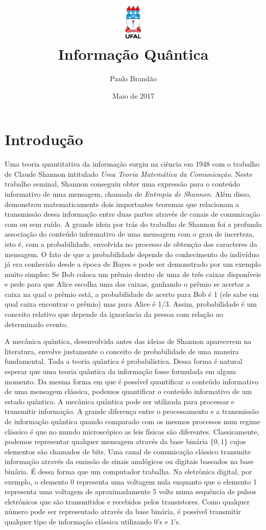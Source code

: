 \documentclass{article}
\title{\includegraphics[width=0.1\textwidth]{ufallogo.png} \\
\Huge{\color{astral}\textbf{Informação Quântica}}}
\author{Paulo Brandão}
\date{Maio de 2017}
\begin{document}
\maketitle

\section{Introdução}

Uma teoria quantitativa da informação surgiu na ciência em 1948 com o trabalho de Claude Shannon intitulado \textit{Uma Teoria Matemática da Comunicação}. Neste trabalho seminal, Shannon conseguiu obter uma expressão para o conteúdo informativo de uma mensagem, chamada de \textit{Entropia de Shannon}. Além disso, demonstrou matematicamente dois importantes teoremas que relacionam a transmissão dessa informação entre duas partes através de canais de comunicação com ou sem ruído. A grande ideia por trás do trabalho de Shannon foi a profunda associação do conteúdo informativo de uma mensagem com o grau de incerteza, isto é, com a probabilidade, envolvida no processo de obtenção dos caracteres da mensagem. O fato de que a probabilidade depende do conhecimento do indivíduo já era conhecido desde a época de Bayes e pode ser demonstrado por um exemplo muito simples: Se Bob coloca um prêmio dentro de uma de três caixas disponíveis e pede para que Alice escolha uma das caixas, ganhando o prêmio se acertar a caixa na qual o prêmio está, a probabilidade de acerto para Bob é 1 (ele sabe em qual caixa encontrar o prêmio) mas para Alice é 1/3. Assim, probabilidade é um conceito relativo que depende da ignorância da pessoa com relação ao determinado evento.

A mecânica quântica, desenvolvida antes das ideias de Shannon aparecerem na literatura, envolve justamente o conceito de probabilidade de uma maneira fundamental. Toda a teoria quântica é probabilística. Dessa forma é natural esperar que uma teoria quântica da informação fosse formulada em algum momento. Da mesma forma em que é possível quantificar o conteúdo informativo de uma mensagem clássica, podemos quantificar o conteúdo informativo de um estado quântico. A mecânica quântica pode ser utilizada para processar e transmitir informação. A grande diferença entre o processamento e a transmissão de informação quântica quando comparado com os mesmos processos num regime clássico é que no mundo microscópico as leis físicas são diferentes. Classicamente, podemos representar qualquer mensagem através da base binária $\{ 0,1 \}$ cujos elementos são chamados de bits. Uma canal de comunicação clássico transmite informação através da emissão de sinais analógicos ou digitais baseados na base binária. É dessa forma que um computador trabalha. Na eletrônica digital, por exemplo, o elemento 0 representa uma voltagem nula enquanto que o elemento 1 representa uma voltagem de aproximadamente 5 volts numa sequência de pulsos eletrônicos que são transmitidos e recebidos pelos transistores. Como qualquer número pode ser representado através da base binária, é possível transmitir qualquer tipo de informação clássica utilizando 0's e 1's.
\end{document}
